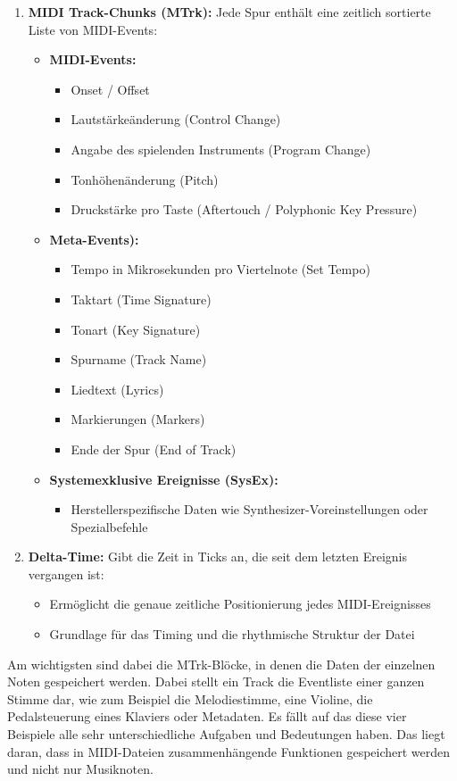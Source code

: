 \begin{description}[style=nextline]
\begin{enumerate}
    \item \textbf{MIDI Track-Chunks (MTrk):} Jede Spur enthält eine zeitlich sortierte Liste von MIDI-Events:
    \begin{itemize}
        \item \textbf{MIDI-Events:}
        \begin{itemize}
            \item Onset / Offset
            \item Lautstärkeänderung (Control Change)
            \item Angabe des spielenden Instruments (Program Change)
            \item Tonhöhenänderung (Pitch)
            \item Druckstärke pro Taste (Aftertouch / Polyphonic Key Pressure)
        \end{itemize}
        \item \textbf{Meta-Events):}
        \begin{itemize}
            \item Tempo in Mikrosekunden pro Viertelnote (Set Tempo)
            \item Taktart (Time Signature)
            \item Tonart (Key Signature)
            \item Spurname (Track Name)
            \item Liedtext (Lyrics)
            \item Markierungen (Markers)
            \item Ende der Spur (End of Track)
        \end{itemize}
        \item \textbf{Systemexklusive Ereignisse (SysEx):}
        \begin{itemize}
            \item Herstellerspezifische Daten wie Synthesizer-Voreinstellungen oder Spezialbefehle
        \end{itemize}
    \end{itemize}

    \item \textbf{Delta-Time:} Gibt die Zeit in Ticks an, die seit dem letzten Ereignis vergangen ist:
    \begin{itemize}
        \item Ermöglicht die genaue zeitliche Positionierung jedes MIDI-Ereignisses
        \item Grundlage für das Timing und die rhythmische Struktur der Datei
    \end{itemize}
\end{enumerate}
Am wichtigsten sind dabei die MTrk-Blöcke, in denen die Daten der einzelnen Noten gespeichert werden.
Dabei stellt ein Track die Eventliste einer ganzen Stimme dar,
wie zum Beispiel die Melodiestimme, eine Violine, die Pedalsteuerung eines Klaviers oder Metadaten.
Es fällt auf das diese vier Beispiele alle sehr unterschiedliche Aufgaben und Bedeutungen haben.
Das liegt daran, dass in MIDI-Dateien zusammenhängende Funktionen gespeichert werden und nicht nur Musiknoten.


\end{description}
